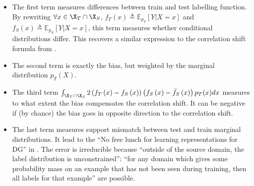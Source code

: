 \begin{itemize}
    \item The first term measures differences between train and test labelling function. By rewriting $\forall x \in \X_T \cap \X_S$, $f_T(x) \triangleq \mathbb{E}_{p_T}[Y|X=x]$ and $f_S(x) \triangleq \mathbb{E}_{p_S}[Y|X=x]$, this term measures whether conditional distributions differ.
    This recovers a similar expression to the correlation shift formula from \cite{ye2021odbench}.
    \item The second term is exactly the \iid bias, but weighted by the marginal distribution $p_T(X)$.
    \item The third term  $\int_{\X_T \cap \X_S} 2 \left(f_T\left(x\right) - f_S\left(x\right)\right) \left(f_S\left(x\right) - \bar{f}_{S}\left(x\right)\right) p_T(x)dx$ measures to what extent the \iid bias compensates the correlation shift. It can be negative if (by chance) the \iid bias goes in opposite direction to the correlation shift.
    \item The last term measures support mismatch between test and train marginal distributions. It lead to the \enquote{No free lunch for learning representations for DG} in \cite{ruan2022optimal}. The error is irreducible because \enquote{outside of the source domain, the label distribution is unconstrained}: \enquote{for any domain which gives some probability mass on an example that has not been seen during training, then all \textelp{} labels for that example} are possible.
\end{itemize}

